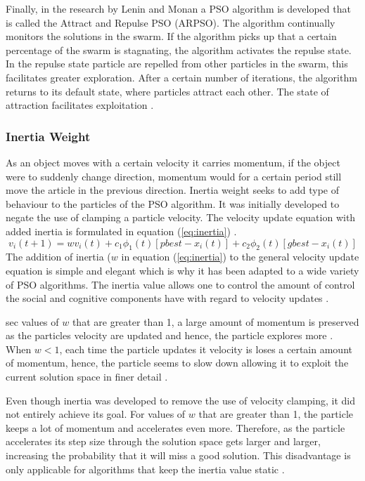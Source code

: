 Finally, in the research by Lenin and Monan a PSO algorithm is developed that is called the Attract and Repulse PSO (ARPSO). The algorithm continually monitors the solutions in the swarm. If the algorithm picks up that a certain percentage of the swarm is stagnating, the algorithm activates the repulse state. In the repulse state particle are repelled from other particles in the swarm, this facilitates greater exploration. After a certain number of iterations, the algorithm returns to its default state, where particles attract each other. The state of attraction facilitates exploitation \cite{PSOAttractRepulse}.
\subsubsection{Inertia Weight}
As an object moves with a certain velocity it carries momentum, if the object were to suddenly change direction, momentum would for a certain period still move the article in the previous direction. Inertia weight seeks to add type of behaviour to the particles of the PSO algorithm. It was initially developed to negate the use of clamping a particle velocity. The velocity update equation with added inertia is formulated in equation (\ref{eq:inertia}) \cite{FundamentalSwarm}.
\begin{equation}
v_i(t+1) = wv_i(t) + c_1\phi_{1}(t)[pbest - x_i(t)] + c_2\phi_{2}(t)[gbest - x_i(t)]\label{eq:inertia}
\end{equation}
The addition of inertia ($w$ in equation (\ref{eq:inertia}) to the general velocity update equation is simple and elegant which is why it has been adapted to a wide variety of PSO algorithms. The inertia value allows one to control the amount of control the social and cognitive components have with regard to velocity updates \cite{FundamentalSwarm}. 

sec values of $w$ that are greater than 1, a large amount of momentum is preserved as the particles velocity are updated and hence, the particle explores more \cite{FundamentalSwarm}. When $w < 1$, each time the particle updates it velocity is loses a certain amount of momentum, hence, the particle seems to slow down allowing it to exploit the current solution space in finer detail \cite{FundamentalSwarm}.

Even though inertia was developed to remove the use of velocity clamping, it did not entirely achieve its goal. For values of $w$ that are greater than 1, the particle keeps a lot of momentum and accelerates even more. Therefore, as the particle accelerates its step size through the solution space gets larger and larger, increasing the probability that it will miss a good solution. This disadvantage is only applicable for algorithms that keep the inertia value static \cite{CompuIntelligenceIntro,FundamentalSwarm}.

